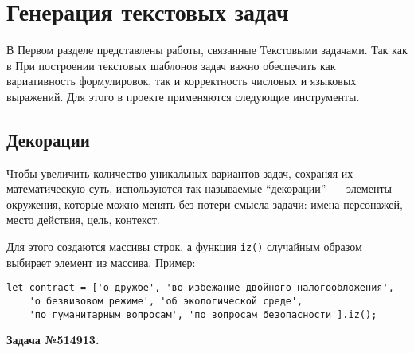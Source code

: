 \section{Генерация текстовых задач}

В Первом разделе представлены работы, связанные Текстовыми задачами. 
Так как в 
При построении текстовых шаблонов задач важно обеспечить как вариативность формулировок, так и корректность числовых и языковых выражений. Для этого в проекте применяются следующие инструменты.

\subsection{Декорации}

Чтобы увеличить количество уникальных вариантов задач, сохраняя их математическую суть, используются так называемые ``декорации''~--- элементы окружения, которые можно менять без потери смысла задачи: имена персонажей, место действия, цель, контекст. 

Для этого создаются массивы строк, а функция \texttt{iz()} случайным образом выбирает элемент из массива.  
Пример:
\begin{lstlisting}
let contract = ['о дружбе', 'во избежание двойного налогообложения',
    'о безвизовом режиме', 'об экологической среде',
    'по гуманитарным вопросам', 'по вопросам безопасности'].iz();
\end{lstlisting}
\textbf{Задача №514913.}

